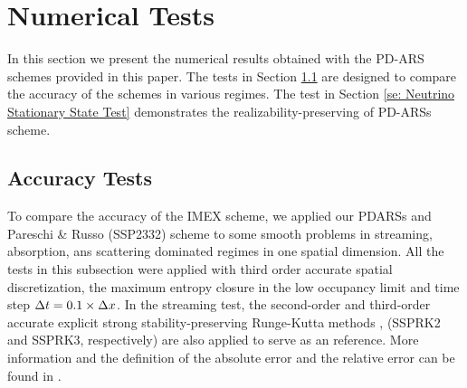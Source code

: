 \section{Numerical Tests}
In this section we present the numerical results obtained with the PD-ARS schemes provided in this paper.
The tests in Section \ref{se: Accuracy Tests} are designed to compare the accuracy of the schemes in various regimes.
The test in Section \ref{se: Neutrino Stationary State Test} demonstrates the realizability-preserving of PD-ARSs scheme.
\subsection{Accuracy Tests}
\label{se: Accuracy Tests}
To compare the accuracy of the IMEX scheme, we applied our PDARSs and Pareschi \& Russo \cite{pareschiRusso_2005} (SSP2332) scheme to some smooth problems in streaming, absorption, ans scattering dominated regimes in one spatial dimension.
All the tests in this subsection were applied with third order accurate spatial discretization, the maximum entropy closure in the low occupancy limit and time step $\Delta t = 0.1 \times \Delta x $.
In the streaming test, the second-order and third-order accurate explicit strong stability-preserving Runge-Kutta methods\cite{gottlieb_etal_2001} , (SSPRK2 and SSPRK3, respectively) are also applied to serve as an reference.
More information and the definition of the absolute error and the relative error can be found in \cite{chu_2018}.

